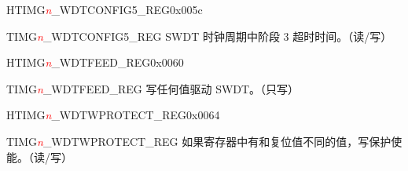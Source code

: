 \begin{register}{H}{TIMG\textcolor{red}{\it{n}}\_WDTCONFIG5\_REG}{0x005c}\label{regdesc:TIMERSWDTCONFIG5REG}
%
\regnewline%
\begin{regdesc}\begin{reglist}
\item [TIMG\textcolor{red}{\it{n}}\_WDTCONFIG5\_REG] SWDT 时钟周期中阶段 3 超时时间。（读/写）
\end{reglist}\end{regdesc}
\end{register}


\begin{register}{H}{TIMG\textcolor{red}{\it{n}}\_WDTFEED\_REG}{0x0060}\label{regdesc:TIMERSWDTFEEDREG}
%
\regnewline%
\begin{regdesc}\begin{reglist}
\item [TIMG\textcolor{red}{\it{n}}\_WDTFEED\_REG]写任何值驱动 SWDT。（只写）
\end{reglist}\end{regdesc}
\end{register}


\begin{register}{H}{TIMG\textcolor{red}{\it{n}}\_WDTWPROTECT\_REG}{0x0064}\label{regdesc:TIMERSWDTWPROTECTREG}
%
\regnewline%
\begin{regdesc}\begin{reglist}
\item [TIMG\textcolor{red}{\it{n}}\_WDTWPROTECT\_REG]如果寄存器中有和复位值不同的值，写保护使能。（读/写）
\end{reglist}\end{regdesc}
\end{register}

